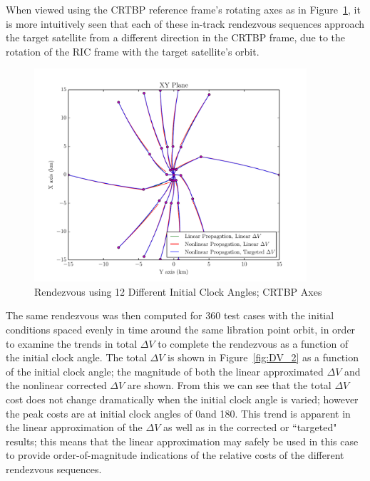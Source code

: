 \documentclass[letterpaper, preprint, paper,11pt]{AAS}	%
\begin{document}
\clearpage

When viewed using the CRTBP reference frame's rotating axes as in Figure~\ref{fig:RLP_2}, it is more intuitively seen that each of these in-track rendezvous sequences approach the target satellite from a different direction in the CRTBP frame, due to the rotation of the RIC frame with the target satellite's orbit.

\begin{figure}[htb] 
	\begin{center}
		\includegraphics[width=0.9\textwidth]{RLP_2} %
		\caption{Rendezvous using 12 Different Initial Clock Angles; CRTBP Axes}
		\label{fig:RLP_2}
	\end{center}
\end{figure}

The same rendezvous was then computed for 360 test cases with the initial conditions spaced evenly in time around the same libration point orbit, in order to examine the trends in total \(\Delta V\) to complete the rendezvous as a function of the initial clock angle. The total \(\Delta V\) is shown in Figure~\ref{fig:DV_2} as a function of the initial clock angle; the magnitude of both the linear approximated \(\Delta V\) and the nonlinear corrected \(\Delta V\) are shown.  From this we can see that the total \(\Delta V\) cost does not change dramatically when the initial clock angle is varied; however the peak costs are at initial clock angles of 0\textdegree and 180\textdegree.  This trend is apparent in the linear approximation of the \(\Delta V\) as well as in the corrected or ``targeted" results; this means that the linear approximation may safely be used in this case to provide order-of-magnitude indications of the relative costs of the different rendezvous sequences.
\end{document}
